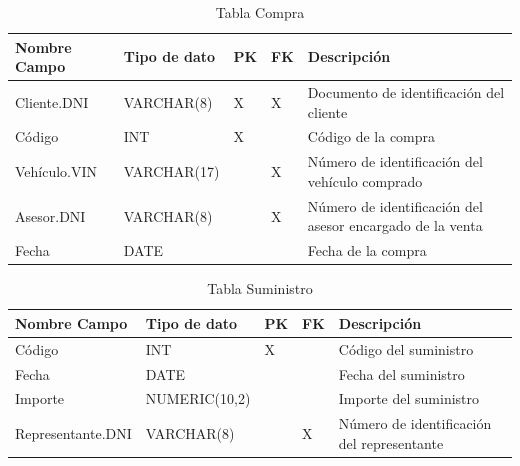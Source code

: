\documentclass[12pt]{article}
\begin{document}
\begin{table}[htbp]
    \begin{center}
        \begin{tabular}{|p{3cm}|p{3cm}|p{1cm}|p{1cm}|p{6cm}|}
            \hline
            Nombre Campo & Tipo de dato & PK & FK & Descripción \\
            \hline
            Cliente.DNI & VARCHAR(8) & X & X & Documento de identificación del cliente\\
            Código & INT & X &  & Código de la compra \\
            Vehículo.VIN & VARCHAR(17) &  & X & Número de identificación del vehículo comprado \\
            Asesor.DNI & VARCHAR(8) &  & X & Número de identificación del asesor encargado de la venta \\
            Fecha & DATE &  &  & Fecha de la compra \\
            \hline
        \end{tabular}
        \caption{Tabla Compra}
    \end{center}
\end{table}


\begin{table}[htbp]
    \begin{center}
        \begin{tabular}{|p{3cm}|p{3cm}|p{1cm}|p{1cm}|p{6cm}|}
            \hline
            Nombre Campo & Tipo de dato & PK & FK & Descripción \\
            \hline
            Código & INT & X &  & Código del suministro \\
            Fecha & DATE &  &  & Fecha del suministro \\
            Importe & NUMERIC(10,2) &  &  & Importe del suministro \\
            Representante.DNI & VARCHAR(8) &  & X & Número de identificación del representante \\
            \hline
            \end{tabular}
        \caption{Tabla Suministro}
    \end{center}
\end{table}
\end{document}
